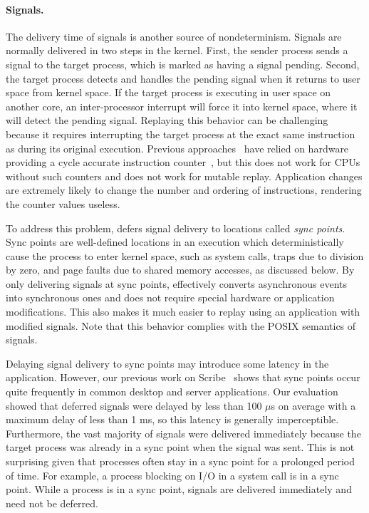 \paragraph{Signals.}
The delivery time of signals is another source of nondeterminism.
Signals are normally delivered in two steps in the kernel.  First, the sender process sends a
signal to the target process, which is marked as having a signal
pending.  Second, the target process detects and handles the pending signal when
it returns to user space from kernel space.  If the target process
is executing in user space on another core, an inter-processor interrupt will force it
into kernel space, where it will detect the pending signal.
Replaying this behavior can be challenging because it requires
interrupting the target process at the exact same instruction as
during its original execution.  Previous
approaches~\cite{bressoud-tft, bressoud, revirt, smp-revirt:vee08}
have relied on hardware providing a cycle accurate instruction
counter~\cite{replica-nondet:ftcs96}, but this does not work for CPUs
without such counters and does not work for mutable replay.
Application changes are extremely likely to change the number and
ordering of instructions, rendering the counter values useless.

To address this problem, {\dora} defers signal delivery to
locations called
\emph{sync points}.  Sync points are well-defined locations in an
execution which deterministically cause the process
to enter kernel space, such as system calls, traps due to division by
zero, and page faults due to shared memory accesses, as discussed
below.  By
only delivering signals at sync points,
{\dora} effectively converts asynchronous events into
synchronous ones and does not require special hardware or application
modifications. This also makes it much easier to replay using an application with
modified signals.
Note that this behavior complies with the POSIX
semantics of signals.

Delaying signal delivery to sync points may introduce some latency in
the application. However,
our previous work on Scribe~\cite{scribe:sigmetrics10} shows that
sync points occur quite frequently in common desktop and server
applications. Our evaluation showed that deferred signals were delayed by
less than 100 $\mu$s on average with a maximum delay of less than 1
ms, so this latency is generally imperceptible.  Furthermore, the vast
majority of signals were delivered immediately
because the target process was
already in a sync point when the signal was sent. This is
not surprising given that processes often stay in a sync point for a
prolonged period of time. For example, a process blocking on I/O in a system
call is in a sync point.
While a process is in a sync point, signals are delivered
immediately and need not be deferred.

